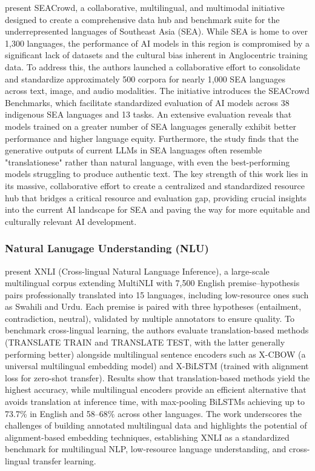 \documentclass[acmsmall]{acmart}
\begin{document}
\citep{lovenia2024seacrowd} present SEACrowd, a collaborative, multilingual, and multimodal initiative designed to create a comprehensive data hub and benchmark suite for the underrepresented languages of Southeast Asia (SEA). While SEA is home to over 1,300 languages, the performance of AI models in this region is compromised by a significant lack of datasets and the cultural bias inherent in Anglocentric training data. To address this, the authors launched a collaborative effort to consolidate and standardize approximately 500 corpora for nearly 1,000 SEA languages across text, image, and audio modalities. The initiative introduces the SEACrowd Benchmarks, which facilitate standardized evaluation of AI models across 38 indigenous SEA languages and 13 tasks. An extensive evaluation reveals that models trained on a greater number of SEA languages generally exhibit better performance and higher language equity. Furthermore, the study finds that the generative outputs of current LLMs in SEA languages often resemble "translationese" rather than natural language, with even the best-performing models struggling to produce authentic text. The key strength of this work lies in its massive, collaborative effort to create a centralized and standardized resource hub that bridges a critical resource and evaluation gap, providing crucial insights into the current AI landscape for SEA and paving the way for more equitable and culturally relevant AI development.


\subsubsection{Natural Lanugage Understanding (NLU)}
\noindent

\citep{conneau2018xnlievaluatingcrosslingualsentence} present XNLI (Cross-lingual Natural Language Inference), a large-scale multilingual corpus extending MultiNLI with 7,500 English premise–hypothesis pairs professionally translated into 15 languages, including low-resource ones such as Swahili and Urdu. Each premise is paired with three hypotheses (entailment, contradiction, neutral), validated by multiple annotators to ensure quality. To benchmark cross-lingual learning, the authors evaluate translation-based methods (TRANSLATE TRAIN and TRANSLATE TEST, with the latter generally performing better) alongside multilingual sentence encoders such as X-CBOW (a universal multilingual embedding model) and X-BiLSTM (trained with alignment loss for zero-shot transfer). Results show that translation-based methods yield the highest accuracy, while multilingual encoders provide an efficient alternative that avoids translation at inference time, with max-pooling BiLSTMs achieving up to 73.7\% in English and 58–68\% across other languages. The work underscores the challenges of building annotated multilingual data and highlights the potential of alignment-based embedding techniques, establishing XNLI as a standardized benchmark for multilingual NLP, low-resource language understanding, and cross-lingual transfer learning. 
\end{document}
